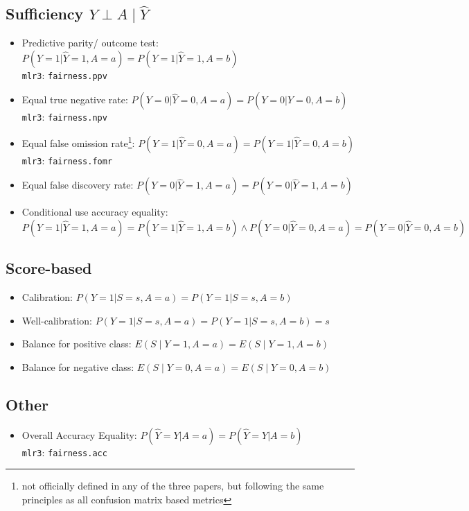 \documentclass[11pt,a4paper]{article}
\begin{document}
\subsection*{Sufficiency $Y \perp A \mid \hat{Y}$}
\begin{itemize}[leftmargin=2em]
    \item Predictive parity/ outcome test: $P(Y = 1 | \hat{Y} = 1, A = a) = P(Y = 1 | \hat{Y} = 1, A = b)$ \\ \texttt{mlr3}: \texttt{fairness.ppv}
    \item Equal true negative rate: $P(Y = 0 | \hat{Y} = 0, A = a) = P(Y = 0 | \hat{Y} = 0, A = b)$ \\ \texttt{mlr3}: \texttt{fairness.npv}
    \item Equal false omission rate\footnote{not officially defined in any of the three papers, but following the same principles as all confusion matrix based metrics}\label{fn:confusion_metrics}: $P(Y = 1 | \hat{Y} = 0, A = a) = P(Y = 1 | \hat{Y} = 0, A = b)$ \\ \texttt{mlr3}: \texttt{fairness.fomr}
    \item Equal false discovery rate: $P(Y = 0 | \hat{Y} = 1, A = a) = P(Y = 0 | \hat{Y} = 1, A = b)$ 
    \item Conditional use accuracy equality: $P(Y = 1 | \hat{Y} = 1, A = a) = P(Y = 1 | \hat{Y} = 1, A = b) \land P(Y = 0 | \hat{Y} = 0, A = a) = P(Y = 0 | \hat{Y} = 0, A = b)$
\end{itemize}

\subsection*{Score-based}
\begin{itemize}
    \item Calibration: $P(Y = 1 | S = s, A = a) = P(Y = 1 | S = s, A = b)$
    \item Well-calibration: $P(Y = 1 | S = s, A = a) = P(Y = 1 | S = s, A = b) = s$
    \item Balance for positive class: $E(S \mid Y = 1, A = a) = E(S \mid Y = 1, A = b)$
    \item Balance for negative class: $E(S \mid Y = 0, A = a) = E(S \mid Y = 0, A = b)$
\end{itemize}
\subsection*{Other}
\begin{itemize}
    \item Overall Accuracy Equality: $P(\hat{Y} = Y | A = a) = P(\hat{Y} = Y | A = b)$ \\ \texttt{mlr3}: \texttt{fairness.acc}
\end{itemize}
\end{document}
